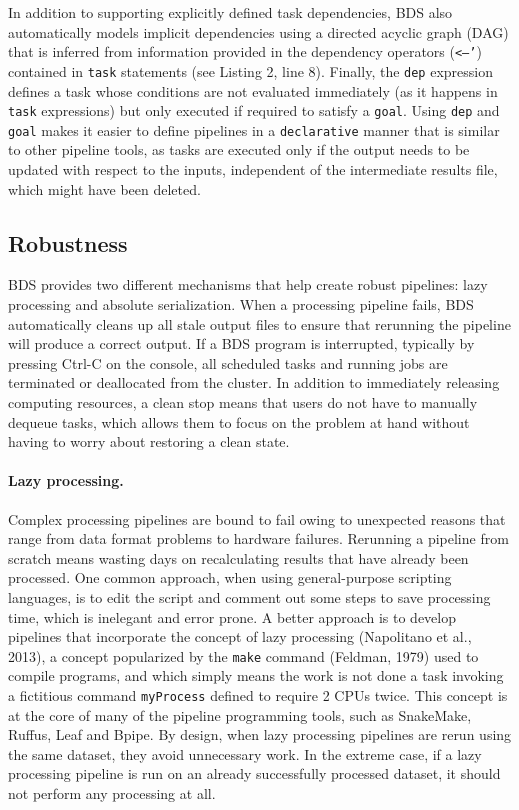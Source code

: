 In addition to supporting explicitly defined task dependencies, BDS also automatically models implicit dependencies using a directed acyclic graph (DAG) that is inferred from information provided in the dependency operators (\texttt{<–’}) contained in \texttt{task} statements (see Listing 2, line 8). Finally, the \texttt{dep} expression defines a task whose conditions are not evaluated immediately (as it happens in \texttt{task} expressions) but only executed if required to satisfy a \texttt{goal}. Using \texttt{dep} and \texttt{goal} makes it easier to define pipelines in a \texttt{declarative} manner that is similar to other pipeline tools, as tasks are executed only if the output needs to be updated with respect to the inputs, independent of the intermediate results file, which might have been deleted.

\subsection{Robustness}

BDS provides two different mechanisms that help create robust pipelines: lazy processing and absolute serialization. When a processing pipeline fails, BDS automatically cleans up all stale output files to ensure that rerunning the pipeline will produce a correct output. If a BDS program is interrupted, typically by pressing Ctrl-C on the console, all scheduled tasks and running jobs are terminated or deallocated from the cluster. In addition to immediately releasing computing resources, a clean stop means that users do not have to manually dequeue tasks, which allows them to focus on the problem at hand without having to worry about restoring a clean state.

\paragraph{Lazy processing.} Complex processing pipelines are bound to fail owing to unexpected reasons that range from data format problems to hardware failures. Rerunning a pipeline from scratch means wasting days on recalculating results that have already been processed. One common approach, when using general-purpose scripting languages, is to edit the script and comment out some steps to save processing time, which is inelegant and error prone. A better approach is to develop pipelines that incorporate the concept of lazy processing (Napolitano et al., 2013), a concept popularized by the \texttt{make} command (Feldman, 1979) used to compile programs, and which simply means the work is not done a task invoking a fictitious command \texttt{myProcess} defined to require 2 CPUs twice. This concept is at the core of many of the pipeline programming tools, such as SnakeMake, Ruffus, Leaf and Bpipe. By design, when lazy processing pipelines are rerun using the same dataset, they avoid unnecessary work. In the extreme case, if a lazy processing pipeline is run on an already successfully processed dataset, it should not perform any processing at all.

